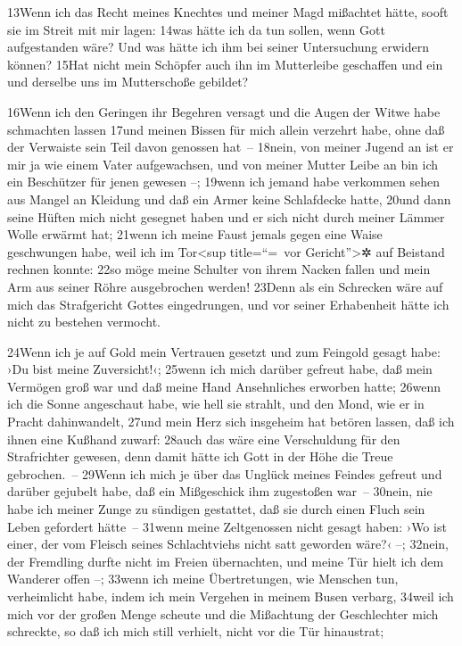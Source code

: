 13Wenn ich das Recht meines Knechtes und meiner Magd mißachtet hätte,
sooft sie im Streit mit mir lagen: 14was hätte ich da tun sollen, wenn
Gott aufgestanden wäre? Und was hätte ich ihm bei seiner Untersuchung
erwidern können? 15Hat nicht mein Schöpfer auch ihn im Mutterleibe
geschaffen und ein und derselbe uns im Mutterschoße gebildet?

16Wenn ich den Geringen ihr Begehren versagt und die Augen der Witwe
habe schmachten lassen 17und meinen Bissen für mich allein verzehrt
habe, ohne daß der Verwaiste sein Teil davon genossen hat~-- 18nein, von
meiner Jugend an ist er mir ja wie einem Vater aufgewachsen, und von
meiner Mutter Leibe an bin ich ein Beschützer für jenen gewesen --;
19wenn ich jemand habe verkommen sehen aus Mangel an Kleidung und daß
ein Armer keine Schlafdecke hatte, 20und dann seine Hüften mich nicht
gesegnet haben und er sich nicht durch meiner Lämmer Wolle erwärmt hat;
21wenn ich meine Faust jemals gegen eine Waise geschwungen habe, weil
ich im Tor\textless sup title=``=~vor Gericht''\textgreater✲ auf
Beistand rechnen konnte: 22so möge meine Schulter von ihrem Nacken
fallen und mein Arm aus seiner Röhre ausgebrochen werden! 23Denn als ein
Schrecken wäre auf mich das Strafgericht Gottes eingedrungen, und vor
seiner Erhabenheit hätte ich nicht zu bestehen vermocht.

24Wenn ich je auf Gold mein Vertrauen gesetzt und zum Feingold gesagt
habe: ›Du bist meine Zuversicht!‹; 25wenn ich mich darüber gefreut habe,
daß mein Vermögen groß war und daß meine Hand Ansehnliches erworben
hatte; 26wenn ich die Sonne angeschaut habe, wie hell sie strahlt, und
den Mond, wie er in Pracht dahinwandelt, 27und mein Herz sich insgeheim
hat betören lassen, daß ich ihnen eine Kußhand zuwarf: 28auch das wäre
eine Verschuldung für den Strafrichter gewesen, denn damit hätte ich
Gott in der Höhe die Treue gebrochen.~-- 29Wenn ich mich je über das
Unglück meines Feindes gefreut und darüber gejubelt habe, daß ein
Mißgeschick ihm zugestoßen war~-- 30nein, nie habe ich meiner Zunge zu
sündigen gestattet, daß sie durch einen Fluch sein Leben gefordert
hätte~-- 31wenn meine Zeltgenossen nicht gesagt haben: ›Wo ist einer,
der vom Fleisch seines Schlachtviehs nicht satt geworden wäre?‹ --;
32nein, der Fremdling durfte nicht im Freien übernachten, und meine Tür
hielt ich dem Wanderer offen --; 33wenn ich meine Übertretungen, wie
Menschen tun, verheimlicht habe, indem ich mein Vergehen in meinem Busen
verbarg, 34weil ich mich vor der großen Menge scheute und die Mißachtung
der Geschlechter mich schreckte, so daß ich mich still verhielt, nicht
vor die Tür hinaustrat;

